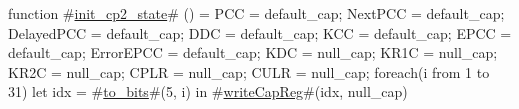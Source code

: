 function #\hyperref[zinitzycp2zystate]{init\_cp2\_state}# () = {
  PCC = default_cap;
  NextPCC = default_cap;
  DelayedPCC = default_cap;
  DDC  = default_cap;
  KCC  = default_cap;
  EPCC = default_cap;
  ErrorEPCC = default_cap;
  KDC  = null_cap;
  KR1C = null_cap;
  KR2C = null_cap;
  CPLR = null_cap;
  CULR = null_cap;
  foreach(i from 1 to 31) {
    let idx = #\hyperref[ztozybits]{to\_bits}#(5, i) in
    #\hyperref[zwriteCapReg]{writeCapReg}#(idx, null_cap)
  }
}
